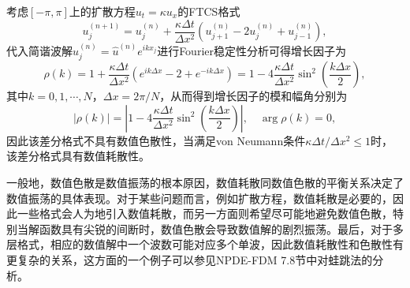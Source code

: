 \documentclass[a4paper,10pt]{ctexart}
\begin{document}
\begin{example}
    考虑$ [-\pi,\pi] $上的扩散方程$ u_t = \kappa u_x $的FTCS格式
    \[
        u^{(n+1)}_j = u^{(n)}_j + \frac{\kappa\Delta t}{\Delta x^2} (u^{(n)}_{j+1} - 2u^{(n)}_j + u^{(n)}_{j-1}),
    \]
    代入简谐波解$ u^{(n)}_j = \hat{u}^{(n)} e^{ikx_j} $进行Fourier稳定性分析可得增长因子为
    \[
        \rho(k) = 1 + \frac{\kappa\Delta t}{\Delta x^2} (e^{ik\Delta x} - 2 + e^{-ik\Delta x}) = 1 - 4\frac{\kappa\Delta t}{\Delta x^2} \sin^2(\frac{k\Delta x}{2}),
    \]
    其中$ k = 0,1,\cdots ,N $，$ \Delta x = 2\pi / N $，从而得到增长因子的模和幅角分别为
    \[
        |\rho(k)| = |1 - 4\frac{\kappa\Delta t}{\Delta x^2} \sin^2(\frac{k\Delta x}{2})|, \quad \arg \rho(k) = 0,
    \]
    因此该差分格式不具有数值色散性，当满足von Neumann条件$ \kappa \Delta t / \Delta x^2\leqslant 1 $时，该差分格式具有数值耗散性。
\end{example}

一般地，数值色散是数值振荡的根本原因，数值耗散同数值色散的平衡关系决定了数值振荡的具体表现。对于某些问题而言，例如扩散方程，数值耗散是必要的，因此一些格式会人为地引入数值耗散，而另一方面则希望尽可能地避免数值色散，特别当解函数具有尖锐的间断时，数值色散会导致数值解的剧烈振荡。最后，对于多层格式，相应的数值解中一个波数可能对应多个单波，因此数值耗散性和色散性有更复杂的关系，这方面的一个例子可以参见NPDE-FDM 7.8节中对蛙跳法的分析。
\end{document}
